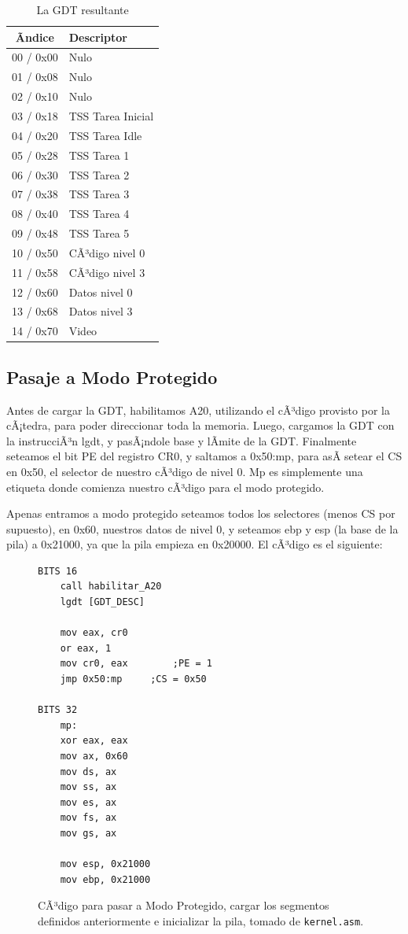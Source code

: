 \documentclass[10pt, a4paper]{article}
\begin{document}
\begin{table}[H]
\centering
    \begin{tabular}{|c|l|}
        \hline
        Ãndice & Descriptor \\ \hline
        00 / 0x00 & Nulo \\ 
        01 / 0x08 & Nulo \\
        02 / 0x10 & Nulo \\ 
        03 / 0x18 & TSS Tarea Inicial \\ 
        04 / 0x20 & TSS Tarea Idle \\ 
        05 / 0x28 & TSS Tarea 1 \\ 
        06 / 0x30 & TSS Tarea 2 \\ 
        07 / 0x38 & TSS Tarea 3  \\ 
        08 / 0x40 & TSS Tarea 4 \\ 
        09 / 0x48 & TSS Tarea 5 \\ 
        10 / 0x50 & CÃ³digo nivel 0 \\ 
        11 / 0x58 & CÃ³digo nivel 3 \\ 
        12 / 0x60 & Datos nivel 0 \\ 
        13 / 0x68 & Datos nivel 3 \\ 
        14 / 0x70 & Video\\ 
        \hline
    \end{tabular}
    \caption{La GDT resultante}
\end{table}
\subsection{Pasaje a Modo Protegido}		
Antes de cargar la GDT, habilitamos A20, utilizando el cÃ³digo provisto por la cÃ¡tedra, para poder direccionar toda la memoria. Luego, cargamos la GDT con la instrucciÃ³n lgdt, y pasÃ¡ndole base y lÃ­mite de la GDT. Finalmente seteamos el bit PE del registro CR0, y saltamos a 0x50:mp, para asÃ­ setear el CS en 0x50, el selector de nuestro cÃ³digo de nivel 0. Mp es simplemente una etiqueta donde comienza nuestro cÃ³digo para el modo protegido.

Apenas entramos a modo protegido seteamos todos los selectores (menos CS por supuesto), en 0x60, nuestros datos de nivel 0, y seteamos ebp y esp (la base de la pila) a 0x21000, ya que la pila empieza en 0x20000. El cÃ³digo es el siguiente:
\begin{figure}[!h]
\begin{center}
\begin{verbatim}
BITS 16
	call habilitar_A20
	lgdt [GDT_DESC]
	
	mov eax, cr0
	or eax, 1		
	mov cr0, eax		;PE = 1
	jmp 0x50:mp		;CS = 0x50
		
BITS 32
    mp:
	xor eax, eax
	mov ax, 0x60
	mov ds, ax
	mov ss, ax
	mov es, ax
	mov fs, ax
	mov gs, ax
		
	mov esp, 0x21000 
	mov ebp, 0x21000 
\end{verbatim}
\caption{CÃ³digo para pasar a Modo Protegido, cargar los segmentos definidos anteriormente e inicializar la pila, tomado de \texttt{kernel.asm}.}
\end{center}
\end{figure}
\newpage
\end{document}
